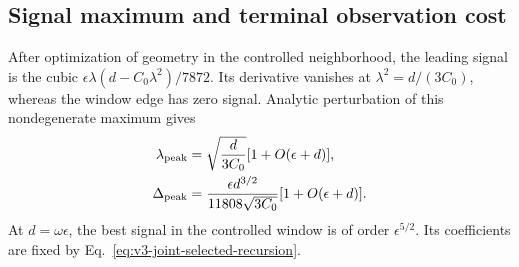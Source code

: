 \documentclass[aps,pre,reprint,amsmath,amssymb,longbibliography]{revtex4-2}
\begin{document}
\subsection{Signal maximum and terminal observation cost}
\label{par:v3-joint-signal-maximum}
\label{par:v3-joint-detection}\label{app:v7-terminal}

After optimization of geometry in the controlled neighborhood, the leading signal is the cubic
$\epsilon\lambda(d-C_0\lambda^2)/7872$. Its derivative vanishes
at $\lambda^2=d/(3C_0)$, whereas the window edge has zero signal.
Analytic perturbation of this nondegenerate maximum gives
\begin{equation}
 \begin{aligned}
 \lambda_{\rm peak}&=\sqrt{\frac{d}{3C_0}}[1+O(\epsilon+d)],\\
 \Delta_{\rm peak}&=\frac{\epsilon d^{3/2}}{11808\sqrt{3C_0}}
                       [1+O(\epsilon+d)].
 \end{aligned}
 \label{eq:v3-joint-signal-peak}
\end{equation}
At $d=\omega\epsilon$, the best signal in the controlled window is of order
$\epsilon^{5/2}$. Its coefficients are fixed by Eq.~\eqref{eq:v3-joint-selected-recursion}.
\end{document}
